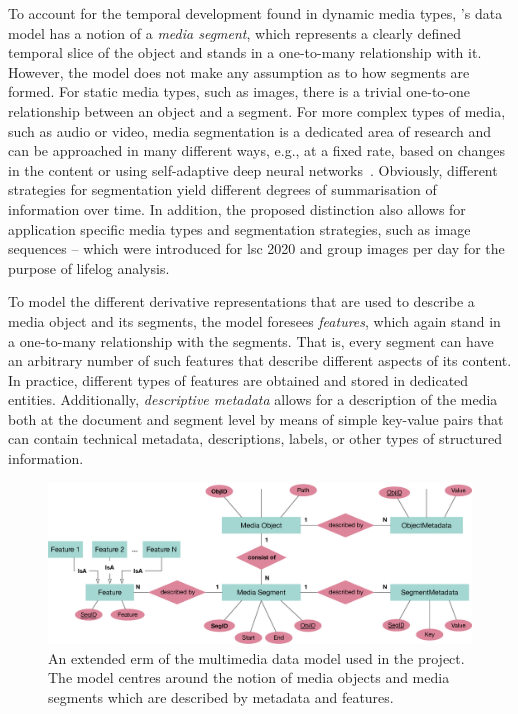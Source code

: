 To account for the temporal development found in dynamic media types, \vitrivr's data model has a notion of a \emph{media segment}, which represents a clearly defined temporal slice of the object and stands in a one-to-many relationship with it. However, the model does not make any assumption as to how segments are formed. For static media types, such as images, there is a trivial one-to-one relationship between an object and a segment. For more complex types of media, such as audio or video, media segmentation is a dedicated area of research \cite{Koprinska:2001temporal} and can be approached in many different ways, e.g., at a fixed rate, based on changes in the content \cite{Foote:2000Automatic,Tsai:2016video} or using self-adaptive deep neural networks~\cite{Souvcek:2019transnet}. Obviously, different strategies for segmentation yield different degrees of summarisation of information over time. In addition, the proposed distinction also allows for application specific media types and segmentation strategies, such as image sequences -- which were introduced for \acrshort{lsc} 2020 \cite{Heller:2020Interactive} and group images per day for the purpose of lifelog analysis.

To model the different derivative representations that are used to describe a media object and its segments, the model foresees \emph{features}, which again stand in a one-to-many relationship with the segments. That is, every segment can have an arbitrary number of such features that describe different aspects of its content. In practice, different types of features are obtained and stored in dedicated entities. Additionally, \emph{descriptive metadata} allows for a description of the media both at the document and segment level by means of simple key-value pairs that can contain technical metadata, descriptions, labels, or other types of structured information.

\begin{figure}[bt]
    \centering
    \includegraphics[width=\textwidth]{figures/erm-media-data-vitrivr}
    \caption{An extended \acrshort{erm} of the multimedia data model used in the \vitrivr{} project. The model centres around the notion of media objects and media segments which are described by metadata and features.}
    \label{figure:erm_mediadata_vitrivr}
\end{figure}

